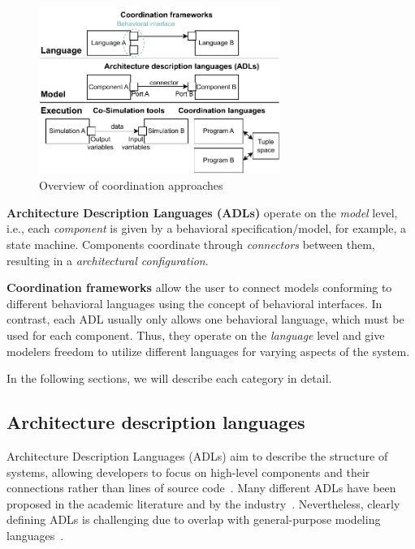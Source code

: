 \documentclass[runningheads]{llncs}
\begin{document}
\begin{figure}[ht]
	\centering
	\includegraphics[width=0.7\textwidth]{images/overview}
	\caption{Overview of coordination approaches}
	\label{fig:overview}
\end{figure}

\textbf{Architecture Description Languages (ADLs)} operate on the \textit{model} level, i.e., each \textit{component} is given by a behavioral specification/model, for example, a state machine.
Components coordinate through \textit{connectors} between them, resulting in a \textit{architectural configuration}.

\textbf{Coordination frameworks} allow the user to connect models conforming to different behavioral languages using the concept of behavioral interfaces.
In contrast, each ADL usually only allows one behavioral language, which must be used for each component.
Thus, they operate on the \textit{language} level and give modelers freedom to utilize different languages for varying aspects of the system.

In the following sections, we will describe each category in detail.

\subsection{Architecture description languages} \label{subsec:adl}
Architecture Description Languages (ADLs) aim to describe the structure of systems, allowing developers to focus on high-level components and their connections rather than lines of source code~\cite{clementsSurveyArchitectureDescription1996,medvidovicClassificationComparisonFramework2000,medvidovicFrameworkClassifyingComparing1997}.
Many different ADLs have been proposed in the academic literature and by the industry~\cite{medvidovicClassificationComparisonFramework2000,woodsArchitectureDescriptionLanguages2005}.
Nevertheless, clearly defining ADLs is challenging due to overlap with general-purpose modeling languages~\cite{clementsSurveyArchitectureDescription1996}.
\end{document}
